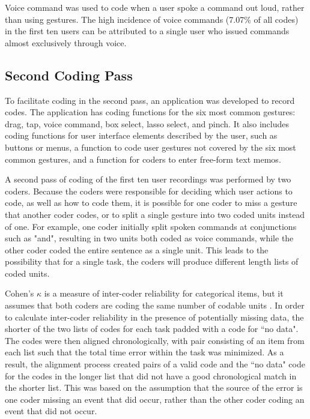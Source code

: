 Voice command was used to code when a user spoke a command out loud, rather than using gestures. The high incidence of voice commands (7.07\% of all codes) in the first ten users can be attributed to a single user who issued commands almost exclusively through voice. 

\subsection{Second Coding Pass} \label{section:Second_Coding_Pass}

To facilitate coding in the second pass, an application was developed to record codes. 
The application has coding functions for the six most common gestures: drag, tap, voice command, box select, lasso select, and pinch. 
It also includes coding functions for user interface elements described by the user, such as buttons or menus, a function to code user gestures not covered by the six most common gestures, and a function for coders to enter free-form text memos. 

A second pass of coding of the first ten user recordings was performed by two coders. 
Because the coders were responsible for deciding which user actions to code, as well as how to code them, it is possible for one coder to miss a gesture that another coder codes, or to split a single gesture into two coded units instead of one. 
For example, one coder initially split spoken commands at conjunctions such as "and", resulting in two units both coded as voice commands, while the other coder coded the entire sentence as a single unit. 
This leads to the possibility that for a single task, the coders will produce different length lists of coded units. 

Cohen's $\kappa$ is a measure of inter-coder reliability for categorical items, but it assumes that both coders are coding the same number of codable units \citep{cohen1960coefficient}. 
In order to calculate inter-coder reliability in the presence of potentially missing data, the  shorter of the two lists of codes for each task padded with a code for ``no data". 
The codes were then aligned chronologically, with pair consisting of an item from each list such that the total time error within the task was minimized.
As a result, the alignment process created pairs of a valid code and the ``no data" code for the codes in the longer list that did not have a good chronological match in the shorter list.
This was based on the assumption that the source of the error is one coder missing an event that did occur, rather than the other coder coding an event that did not occur. 

